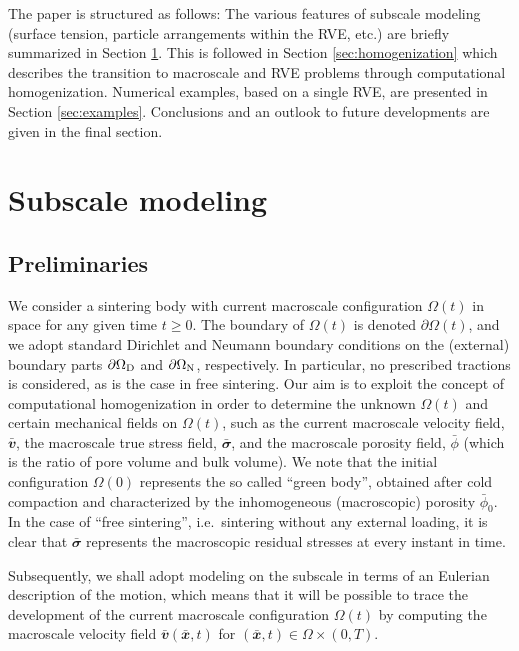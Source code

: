\documentclass[12pt,review]{elsarticle}
\renewcommand{\ta}[1]{\mathbfit{#1}}
\renewcommand{\ts}[1]{\mathbfit{#1}}
\newcommand{\figref}[1]{Figure~\ref{#1}}
\newcommand{\pore}{\mathrm{pore}}
\newcommand{\particle}{\mathrm{part}}
\newcommand{\contact}{\mathrm{cont}}
\begin{document}
The paper is structured as follows:
The various features of subscale modeling (surface tension, particle arrangements within the RVE, etc.) are briefly summarized in Section \ref{sec:subscale}.
This is followed in Section \ref{sec:homogenization} which describes the transition to macroscale and RVE problems through computational homogenization.
Numerical examples, based on a single RVE, are presented in Section \ref{sec:examples}.
Conclusions and an outlook to future developments are given in the final section.


\section{Subscale modeling}\label{sec:subscale}

\subsection{Preliminaries}

We consider a sintering body with current macroscale configuration $\Omega(t)$ in space for any given time $t\geq 0$.
The boundary of $\Omega(t)$ is denoted $\partial\Omega(t)$, and we adopt standard Dirichlet and Neumann boundary conditions on the (external) boundary parts $\partial\Omega_{\mathrm{D}}$ and $\partial\Omega_{\mathrm{N}}$, respectively.
In particular, no prescribed tractions is considered, as is the case in free sintering.
Our aim is to exploit the concept of computational homogenization in order to determine the unknown $\Omega(t)$ and certain mechanical fields on $\Omega(t)$, such as the current macroscale velocity field, $\bar{\ts v}$, the macroscale true stress field, $\bar{\ts\sigma}$, and the macroscale porosity field, $\bar{\phi}$ (which is the ratio of pore volume and bulk volume).
We note that the initial configuration $\Omega(0)$ represents the so called ``green body'', obtained after cold compaction and characterized by the inhomogeneous (macroscopic) porosity $\bar{\phi}_0$.
In the case of ``free sintering'', i.e.\ sintering without any external loading, it is clear that $\bar{\ts\sigma}$ represents the macroscopic residual stresses at every instant in time.

Subsequently, we shall adopt modeling on the subscale in terms of an Eulerian description of the motion, which means that it will be possible to trace the development of the current macroscale configuration $\Omega(t)$ by computing the macroscale velocity field $\bar{\ta v}(\bar{\ta x},t)$ for $(\bar{\ta x},t)\in\Omega\times(0,T)$.
\end{document}
